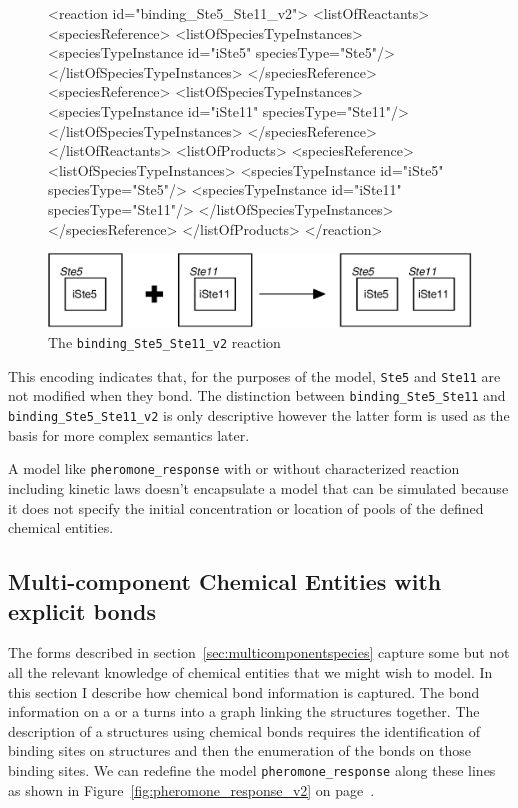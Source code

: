 \documentclass{cekarticle}
\begin{document}
\begin{figure}[h]
\begin{example}
<reaction id="binding_Ste5_Ste11_v2">
    <listOfReactants>
        <speciesReference>
            <listOfSpeciesTypeInstances>
                <speciesTypeInstance id="iSte5" speciesType="Ste5"/>
            </listOfSpeciesTypeInstances>
        </speciesReference>
        <speciesReference>
            <listOfSpeciesTypeInstances>
                <speciesTypeInstance id="iSte11" speciesType="Ste11"/>
            </listOfSpeciesTypeInstances>
        </speciesReference>
    </listOfReactants>
    <listOfProducts>
        <speciesReference>
            <listOfSpeciesTypeInstances>
                <speciesTypeInstance id="iSte5" speciesType="Ste5"/>
                <speciesTypeInstance id="iSte11" speciesType="Ste11"/>
            </listOfSpeciesTypeInstances>
        </speciesReference>
    </listOfProducts>
</reaction>
\end{example}
  \vspace*{8pt}
  \centering
  \includegraphics[scale = 0.7]{binding_Ste5_Ste11_v2.eps}
  \caption{The \texttt{binding\_Ste5\_Ste11\_v2} reaction}
  \label{fig:binding_Ste5_Ste11_v2}
\end{figure}

This encoding indicates that, for the purposes of the model, \texttt{Ste5} and \texttt{Ste11}
are not modified when they bond.  The distinction between \texttt{binding\_Ste5\_Ste11}
and \texttt{binding\_Ste5\_Ste11\_v2} is only descriptive however the latter form
is used as the basis for more complex semantics later. 

A model like \texttt{pheromone\_response} with or without characterized reaction including kinetic laws
doesn't encapsulate a model that can be simulated because it does not specify the initial concentration
or location of pools of the defined chemical entities.

\subsection{Multi-component Chemical Entities with explicit bonds}
\label{sec:explicitbonds}

The forms described in section~\ref{sec:multicomponentspecies} capture some but not all
the relevant knowledge of chemical entities that we might wish to model.  In this section I
describe how chemical bond information is captured.
The bond information on a  or a  turns into a
graph linking the  structures together.
The description of a structures using chemical
bonds requires the identification of binding sites on  structures and
then the enumeration of the bonds on those binding sites.  We can redefine the model
\texttt{pheromone\_response} along these lines as shown in Figure~\ref{fig:pheromone_response_v2} on
page~\pageref{fig:pheromone_response_v2}.
\end{document}
